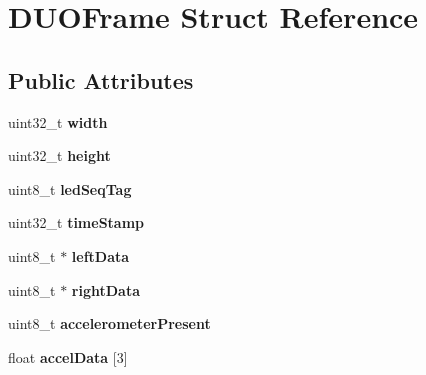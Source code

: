 \hypertarget{struct_d_u_o_frame}{}\section{D\+U\+O\+Frame Struct Reference}
\label{struct_d_u_o_frame}
\subsection*{Public Attributes}
\begin{DoxyCompactItemize}
\item 
uint32\+\_\+t {\bfseries width}\hypertarget{struct_d_u_o_frame_ac228aeeb970e5878e89754f90e542feb}{}\label{struct_d_u_o_frame_ac228aeeb970e5878e89754f90e542feb}

\item 
uint32\+\_\+t {\bfseries height}\hypertarget{struct_d_u_o_frame_aef893fe5e2b46bf24a76fcb5287c16ed}{}\label{struct_d_u_o_frame_aef893fe5e2b46bf24a76fcb5287c16ed}

\item 
uint8\+\_\+t {\bfseries led\+Seq\+Tag}\hypertarget{struct_d_u_o_frame_afcfc6e051bbfcc16d9c1954236ecb164}{}\label{struct_d_u_o_frame_afcfc6e051bbfcc16d9c1954236ecb164}

\item 
uint32\+\_\+t {\bfseries time\+Stamp}\hypertarget{struct_d_u_o_frame_a862bf3c8bc3f60e1cc8f3e14d034449a}{}\label{struct_d_u_o_frame_a862bf3c8bc3f60e1cc8f3e14d034449a}

\item 
uint8\+\_\+t $\ast$ {\bfseries left\+Data}\hypertarget{struct_d_u_o_frame_afbdd579c261b0905c612ff1bbf29dfbe}{}\label{struct_d_u_o_frame_afbdd579c261b0905c612ff1bbf29dfbe}

\item 
uint8\+\_\+t $\ast$ {\bfseries right\+Data}\hypertarget{struct_d_u_o_frame_afbd986162ac9b0787d42eecfaa5a27f2}{}\label{struct_d_u_o_frame_afbd986162ac9b0787d42eecfaa5a27f2}

\item 
uint8\+\_\+t {\bfseries accelerometer\+Present}\hypertarget{struct_d_u_o_frame_a2fb9da82d097f85854b11649d4f1dce8}{}\label{struct_d_u_o_frame_a2fb9da82d097f85854b11649d4f1dce8}

\item 
float {\bfseries accel\+Data} \mbox{[}3\mbox{]}\hypertarget{struct_d_u_o_frame_ae4146901d712012a29ff0faf9111d789}{}\label{struct_d_u_o_frame_ae4146901d712012a29ff0faf9111d789}


\end{DoxyCompactItemize}
